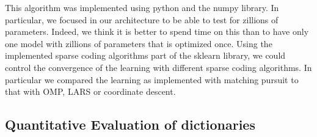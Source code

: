 \documentclass[a4paper, 11pt, draft]{article} %
\begin{document}
This algorithm was implemented using python and the numpy library. In particular, we focused in our architecture to be able to test for zillions of parameters. Indeed, we think it is better to spend time on this than to have only one model with zillions of parameters that is optimized once.
Using the implemented sparse coding algorithms part of the sklearn library, we could control the convergence of the learning with different sparse coding algorithms. In particular we compared the learning as implemented with matching pursuit to that with  OMP, LARS or coordinate descent. 

\subsection{Quantitative Evaluation of dictionaries}
\end{document}
